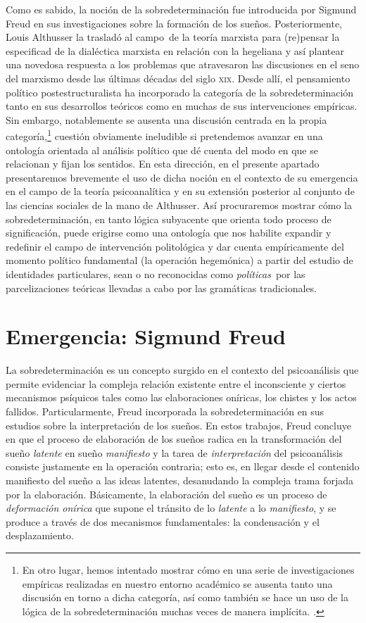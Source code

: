 Como es sabido, la noción de la sobredeterminación fue introducida por Sigmund Freud en sus investigaciones sobre la formación de los sueños. Posteriormente, Louis Althusser la trasladó al campo~de la teoría marxista para (re)pensar la especificad de la dialéctica marxista en relación con la hegeliana y así plantear una novedosa respuesta a los problemas que atravesaron las discusiones en el seno del marxismo desde las últimas décadas del siglo \textsc{xix}. Desde allí, el pensamiento político postestructuralista ha incorporado la categoría de la sobredeterminación tanto en sus desarrollos teóricos como en muchas de sus intervenciones empíricas. Sin embargo, notablemente se ausenta una discusión centrada en la propia categoría,\footnote{En otro lugar, hemos intentado mostrar cómo en una serie de investigaciones empíricas realizadas en nuestro entorno académico se ausenta tanto una discusión en torno a dicha categoría, así como también se hace un uso de la lógica de la sobredeterminación muchas veces de manera implícita. \cite[Véase][]{@7030-DAIN2007}.} cuestión obviamente ineludible si pretendemos avanzar en una ontología orientada al análisis político que dé cuenta del modo en que se relacionan y fijan los sentidos. En esta dirección, en el presente apartado presentaremos brevemente el uso de dicha noción en el contexto de su emergencia en el campo de la teoría psicoanalítica y en su extensión posterior al conjunto de las ciencias sociales de la mano de Althusser. Así procuraremos mostrar cómo la sobredeterminación, en tanto lógica subyacente que orienta todo proceso de significación, puede erigirse como una ontología que nos habilite expandir y redefinir el campo de intervención politológica y dar cuenta empíricamente del momento político fundamental (la operación hegemónica) a partir del estudio de identidades particulares, sean o no reconocidas como \emph{políticas}~por las parcelizaciones teóricas llevadas a cabo por las gramáticas tradicionales.


\section{Emergencia: Sigmund Freud}

La sobredeterminación es un concepto surgido en el contexto del psicoanálisis que permite evidenciar la compleja relación existente entre el inconsciente y ciertos mecanismos psíquicos tales como las elaboraciones oníricas, los chistes y los actos fallidos. Particularmente, Freud incorporada la sobredeterminación en sus estudios sobre la interpretación de los sueños. En estos trabajos, Freud concluye en que el proceso de elaboración de los sueños radica en la transformación del sueño \emph{latente} en sueño \emph{manifiesto} y la tarea de \emph{interpretación} del psicoanálisis consiste justamente en la operación contraria; esto es, en llegar desde el contenido manifiesto del sueño a las ideas latentes, desanudando la compleja trama forjada por la elaboración. Básicamente, la elaboración del sueño es un proceso de \emph{deformación onírica} que supone el tránsito de lo \emph{latente} a lo \emph{manifiesto}, y se produce a través de dos mecanismos fundamentales: la condensación y el desplazamiento.

